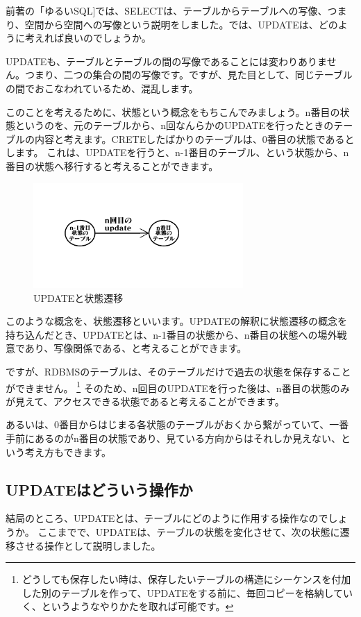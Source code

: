 前著の「ゆるいSQL]では、SELECTは、テーブルからテーブルへの写像、つまり、空間から空間への写像という説明をしました。では、UPDATEは、どのように考えれば良いのでしょうか。

UPDATEも、テーブルとテーブルの間の写像であることには変わりありません。つまり、二つの集合の間の写像です。ですが、見た目として、同じテーブルの間でおこなわれているため、混乱します。

このことを考えるために、状態という概念をもちこんでみましょう。n番目の状態というのを、元のテーブルから、n回なんらかのUPDATEを行ったときのテーブルの内容と考えます。CRETEしたばかりのテーブルは、0番目の状態であるとします。
これは、UPDATEを行うと、n-1番目のテーブル、という状態から、n番目の状態へ移行すると考えることができます。

\begin{figure}[htbp]
  \includegraphics[width=8cm,pagebox=cropbox]{draw/update1.pdf}
  \caption{UPDATEと状態遷移}
  \label{fig:change}
\end{figure}

このような概念を、状態遷移といいます。UPDATEの解釈に状態遷移の概念を持ち込んだとき、UPDATEとは、n-1番目の状態から、n番目の状態への場外戦意であり、写像関係である、と考えることができます。

ですが、RDBMSのテーブルは、そのテーブルだけで過去の状態を保存することができません。
\footnote{どうしても保存したい時は、保存したいテーブルの構造にシーケンスを付加した別のテーブルを作って、UPDATEをする前に、毎回コピーを格納していく、というようなやりかたを取れば可能です。}
そのため、n回目のUPDATEを行った後は、n番目の状態のみが見えて、アクセスできる状態であると考えることができます。

あるいは、0番目からはじまる各状態のテーブルがおくから繋がっていて、一番手前にあるのがn番目の状態であり、見ている方向からはそれしか見えない、という考え方もできます。

\subsection{UPDATEはどういう操作か}

結局のところ、UPDATEとは、テーブルにどのように作用する操作なのでしょうか。
ここまでで、UPDATEは、テーブルの状態を変化させて、次の状態に遷移させる操作として説明しました。

